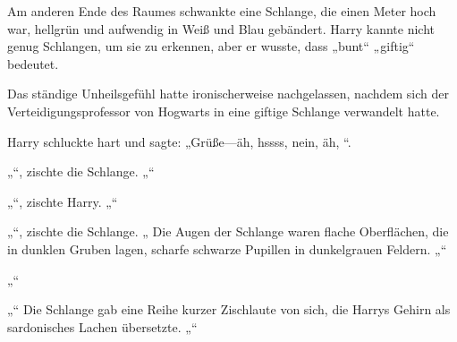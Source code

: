 Am anderen Ende des Raumes schwankte eine Schlange, die einen Meter hoch war, hellgrün und aufwendig in Weiß und Blau gebändert. Harry kannte nicht genug Schlangen, um sie zu erkennen, aber er wusste, dass „bunt“ „giftig“ bedeutet.

Das ständige Unheilsgefühl hatte ironischerweise nachgelassen, nachdem sich der Verteidigungsprofessor von Hogwarts in eine giftige Schlange verwandelt hatte.

Harry schluckte hart und sagte: „Grüße—äh, hssss, nein, äh, “.

„“, zischte die Schlange. „“

„“, zischte Harry. „“

„“, zischte die Schlange. „ Die Augen der Schlange waren flache Oberflächen, die in dunklen Gruben lagen, scharfe schwarze Pupillen in dunkelgrauen Feldern. „“

„“

„“ Die Schlange gab eine Reihe kurzer Zischlaute von sich, die Harrys Gehirn als sardonisches Lachen übersetzte. „“

